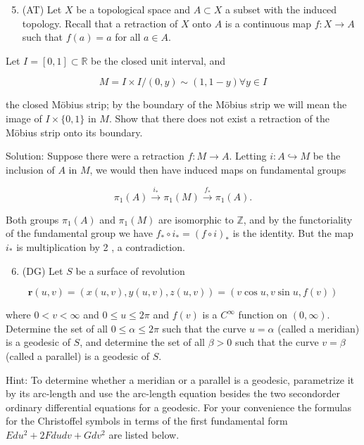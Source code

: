 \documentclass[10pt]{article}
\begin{document}
\begin{enumerate}
  \setcounter{enumi}{4}
  \item (AT) Let $X$ be a topological space and $A \subset X$ a subset with the induced topology. Recall that a retraction of $X$ onto $A$ is a continuous map $f: X \rightarrow A$ such that $f(a)=a$ for all $a \in A$.
\end{enumerate}

Let $I=[0,1] \subset \mathbb{R}$ be the closed unit interval, and

$$
M=I \times I /(0, y) \sim(1,1-y) \forall y \in I
$$

the closed Möbius strip; by the boundary of the Möbius strip we will mean the image of $I \times\{0,1\}$ in $M$. Show that there does not exist a retraction of the Möbius strip onto its boundary.

Solution: Suppose there were a retraction $f: M \rightarrow A$. Letting $i: A \hookrightarrow M$ be the inclusion of $A$ in $M$, we would then have induced maps on fundamental groups

$$
\pi_{1}(A) \stackrel{i_{*}}{\longrightarrow} \pi_{1}(M) \stackrel{f_{*}}{\longrightarrow} \pi_{1}(A) .
$$

Both groups $\pi_{1}(A)$ and $\pi_{1}(M)$ are isomorphic to $\mathbb{Z}$, and by the functoriality of the fundamental group we have $f_{*} \circ i_{*}=(f \circ i)_{*}$ is the identity. But the map $i_{*}$ is multiplication by 2 , a contradiction.

\begin{enumerate}
  \setcounter{enumi}{5}
  \item (DG) Let $S$ be a surface of revolution
\end{enumerate}

$$
\mathbf{r}(u, v)=(x(u, v), y(u, v), z(u, v))=(v \cos u, v \sin u, f(v))
$$

where $0<v<\infty$ and $0 \leq u \leq 2 \pi$ and $f(v)$ is a $C^{\infty}$ function on $(0, \infty)$. Determine the set of all $0 \leq \alpha \leq 2 \pi$ such that the curve $u=\alpha$ (called a meridian) is a geodesic of $S$, and determine the set of all $\beta>0$ such that the curve $v=\beta$ (called a parallel) is a geodesic of $S$.

Hint: To determine whether a meridian or a parallel is a geodesic, parametrize it by its arc-length and use the arc-length equation besides the two secondorder ordinary differential equations for a geodesic. For your convenience the formulas for the Christoffel symbols in terms of the first fundamental form $E d u^{2}+2 F d u d v+G d v^{2}$ are listed below.
\end{document}
